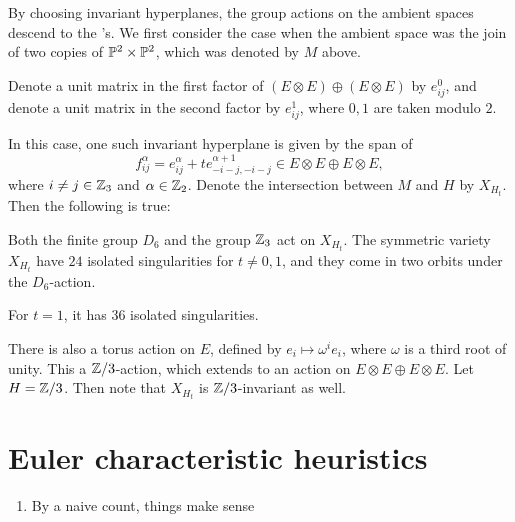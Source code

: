 
By choosing invariant hyperplanes, the group actions on the ambient spaces descend to the \CY's. We first consider the case when the ambient space was the join of two copies of $\P^2 \times \P^2$, which was denoted by $M$ above.

Denote a unit matrix in the first factor of $(E \otimes E) \oplus (E \otimes E)$ by $e_{ij}^0$, and denote a unit matrix in the second factor by $e_{ij}^1$, where $0,1$ are taken modulo $2$. 

In this case, one such invariant hyperplane is given by the span of
$$
f_{ij}^\alpha = e_{ij}^\alpha + t e_{-i-j,-i-j}^{\alpha+1} \in E\otimes E \oplus E \otimes E,
$$
where $i \neq j \in \Z_3$ and $\alpha \in \Z_2$. Denote the intersection between $M$ and $H$ by $X_{H_t}$. Then the following is true:

\begin{proposition}
Both the finite group $D_6$ and the group $\Z_3$ act on $X_{H_t}$. The symmetric variety $X_{H_t}$ have $24$ isolated singularities for $t \neq 0,1$, and they come in two orbits under the $D_6$-action.

For $t=1$, it has $36$ isolated singularities.
\end{proposition}

There is also a torus action on $E$, defined by $e_i \mapsto \omega^i e_i$, where $\omega$ is a third root of unity. This a $\Z/3$-action, which extends to an action on $ E\otimes E \oplus E \otimes E$. Let $H=\Z/3$. Then note that $X_{H_t}$ is $\Z/3$-invariant as well. 





\section{Euler characteristic heuristics}

\begin{enumerate}
	\item By a naive count, things make sense
\end{enumerate}

